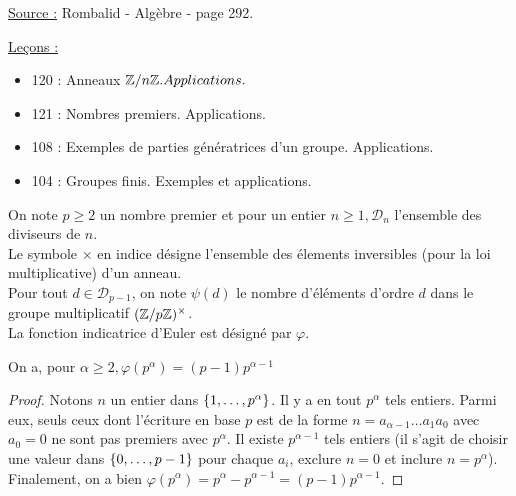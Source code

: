 

\newcommand{\Zpz}{(\Z/p\Z)^{\times}}
\newcommand{\Zpaz}{(\Z/p^{\alpha}\Z)^{\times}}
\newcommand{\D}{\mathcal{D}}

\pagestyle{fancy}

\fancyhead[C]{Cyclicité du groupe $\Zpaz$}
\fancyhead[R]{}



\underline{Source :} Rombalid - Algèbre - page 292. \newline

\underline{Leçons :}
\begin{itemize}
\item 120 : Anneaux $\mathbb{Z}/n\mathbb{Z}. Applications.$
\item 121 : Nombres premiers. Applications.
\item 108 : Exemples de parties génératrices d’un groupe. Applications.
\item 104 : Groupes finis. Exemples et applications.
\end{itemize}

\begin{nota}
On note $p \geq 2$ un nombre premier et pour un entier $n \geq 1, \D_n$ l'ensemble des diviseurs de $n$. \\
Le symbole $\times$ en indice désigne l'ensemble des élements inversibles (pour la loi multiplicative) d'un anneau. \\
Pour tout $d \in \D_{p-1}$, on note $\psi(d)$ le nombre d'éléments d'ordre $d$ dans le groupe multiplicatif $\Zpz$. \\
La fonction indicatrice d'Euler est désigné par $\varphi$.
\end{nota}

\begin{lem}
On a, pour $\alpha \geq 2, \varphi(p^{\alpha}) = (p-1)p^{\alpha-1}$
\end{lem}

\begin{proof}
Notons $n$ un entier dans $\{ 1, \dots, p^{\alpha} \}$. Il y a en tout $p^{\alpha}$ tels entiers.
Parmi eux, seuls ceux dont l'écriture en base $p$ est de la forme $n = a_{\alpha-1}\dots a_1 a_0$ avec $a_0=0$ ne sont pas premiers
avec $p^{\alpha}$. Il existe $p^{\alpha-1}$ tels entiers (il s'agit de choisir une valeur dans $\{ 0, \dots, p-1 \}$ pour chaque $a_i$,
exclure $n=0$ et inclure $n=p^{\alpha}$).
Finalement, on a bien $\varphi(p^{\alpha}) = p^{\alpha} - p^{\alpha-1} = (p-1)p^{\alpha-1}$.
\end{proof}

